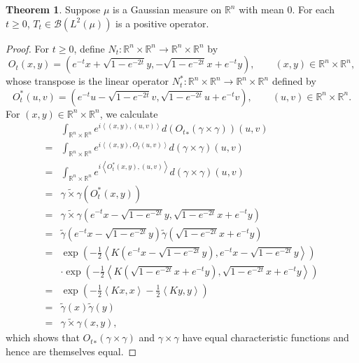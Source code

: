 \documentclass{article}
\newcommand{\inner}[2]{\left\langle #1, #2 \right\rangle}
\theoremstyle{definition}
\newtheorem{theorem}{Theorem}
\theoremstyle{definition}
\begin{document}
\begin{theorem}
Suppose $\mu$ is a Gaussian measure on $\mathbb{R}^n$ with mean $0$. 
For each $t \geq 0$, $T_t \in \mathscr{B}(L^2(\mu))$
is a positive operator.
\end{theorem}
\begin{proof}
For $t \geq 0$, define $N_t:\mathbb{R}^n \times \mathbb{R}^n \to \mathbb{R}^n \times  \mathbb{R}^n$ by
\[
O_t(x,y) = \left(e^{-t}x+\sqrt{1-e^{-2t}}y,-\sqrt{1-e^{-2t}}x+e^{-t}y\right), \qquad (x,y) \in \mathbb{R}^n \times \mathbb{R}^n,
\]
whose transpose is the linear operator $N_t^*:\mathbb{R}^n \times \mathbb{R}^n \to \mathbb{R}^n \times  \mathbb{R}^n$ defined by
\[
O_t^*(u,v) = \left(e^{-t}u-\sqrt{1-e^{-2t}}v,\sqrt{1-e^{-2t}}u+e^{-t}v\right), \qquad (u,v) \in \mathbb{R}^n \times \mathbb{R}^n.
\]
For $(x,y) \in \mathbb{R}^n \times \mathbb{R}^n$, we calculate 
\[
\begin{split}
&\int_{\mathbb{R}^n \times \mathbb{R}^n} e^{i\inner{(x,y)}{(u,v)}} d({O_t}_*(\gamma \times \gamma))(u,v)\\
=&\int_{\mathbb{R}^n \times \mathbb{R}^n} e^{i\inner{(x,y)}{O_t(u,v)}} d(\gamma \times \gamma)(u,v)\\
=&\int_{\mathbb{R}^n \times \mathbb{R}^n}  e^{i\inner{O_t^*(x,y)}{(u,v)}} d(\gamma \times \gamma)(u,v)\\
=&\widetilde{\gamma \times \gamma}(O_t^*(x,y))\\
=&\widetilde{\gamma \times \gamma}(e^{-t}x-\sqrt{1-e^{-2t}}y,\sqrt{1-e^{-2t}}x+e^{-t}y)\\
=&\widetilde{\gamma}(e^{-t}x-\sqrt{1-e^{-2t}}y) \widetilde{\gamma}(\sqrt{1-e^{-2t}}x+e^{-t}y)\\
=&\exp\left(-\frac{1}{2}\inner{K(e^{-t}x-\sqrt{1-e^{-2t}}y)}{e^{-t}x-\sqrt{1-e^{-2t}}y}\right)\\
&\cdot \exp\left(-\frac{1}{2}\inner{K(\sqrt{1-e^{-2t}}x+e^{-t}y)}{\sqrt{1-e^{-2t}}x+e^{-t}y} \right)\\
=&\exp\left(-\frac{1}{2}\inner{Kx}{x}-\frac{1}{2}\inner{Ky}{y}\right)\\
=&\widetilde{\gamma}(x) \widetilde{\gamma}(y)\\
=&\widetilde{\gamma \times \gamma}(x,y),
\end{split}
\]
which shows that ${O_t}_*(\gamma \times \gamma)$ and $\gamma \times \gamma$ have equal characteristic functions and hence
are themselves equal. 


\end{proof}
\end{document}
